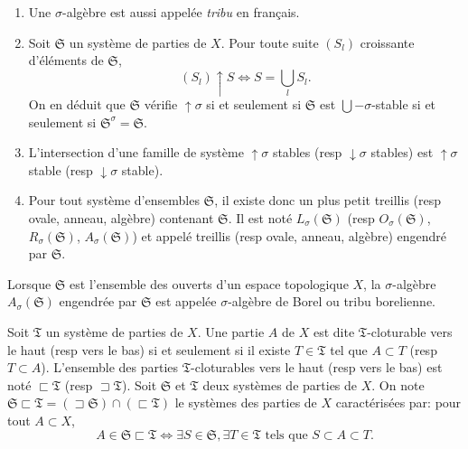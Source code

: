 \begin{rems}
\begin{enumerate}
 \item Une $\sigma$-algèbre est aussi appelée \emph{tribu} en français.
 \item Soit $\mathfrak{S}$ un système de parties de $X$. Pour toute suite $(S_l)$ croissante d'éléments de $\mathfrak{S}$,
   \begin{displaymath}
     (S_l)\uparrow S \Leftrightarrow  S = \bigcup_l S_l.
   \end{displaymath}
  On en déduit que $\mathfrak{S}$ vérifie $\uparrow \sigma$ si et seulement si $\mathfrak{S}$ est $\bigcup - \sigma$-stable si et seulement si $\mathfrak{S}^\sigma = \mathfrak{S}$.
 \item L'intersection d'une famille de système $\uparrow \sigma$ stables (resp $\downarrow \sigma$ stables) est $\uparrow \sigma$ stable (resp $\downarrow \sigma$ stable).
 \item Pour tout système d'ensembles $\mathfrak{S}$, il existe donc un plus petit treillis (resp ovale, anneau, algèbre) contenant $\mathfrak{S}$. Il est noté $L_\sigma(\mathfrak{S})$ (resp $O_\sigma(\mathfrak{S})$, $R_\sigma(\mathfrak{S})$, $A_\sigma(\mathfrak{S})$) et appelé treillis (resp ovale, anneau, algèbre) engendré par $\mathfrak{S}$.
\end{enumerate}
\end{rems}
\begin{exple}
Lorsque $\mathfrak{S}$ est l'ensemble des ouverts d'un espace topologique $X$, la $\sigma$-algèbre $A_\sigma(\mathfrak{S})$ engendrée par $\mathfrak{S}$ est appelée $\sigma$-algèbre de Borel ou tribu borelienne.
\end{exple}

\begin{defin}\label{Def:cloturable}  
 Soit $\mathfrak{T}$ un système de parties de $X$. Une partie $A$ de $X$ est dite $\mathfrak{T}$-cloturable vers le haut (resp vers le bas) si et seulement si il existe $T\in \mathfrak{T}$ tel que $A \subset T$ (resp $T \subset A$).\newline
 L'ensemble des parties $\mathfrak{T}$-cloturables vers le haut (resp vers le bas) est noté $\sqsubset \mathfrak{T}$ (resp $\sqsupset \mathfrak{T}$).\newline
 Soit $\mathfrak{S}$ et $\mathfrak{T}$ deux systèmes de parties de $X$. On note $\mathfrak{S} \sqsubset \mathfrak{T} = (\sqsupset \mathfrak{S}) \cap (\sqsubset \mathfrak{T})$ le systèmes des parties de $X$ caractérisées par: pour tout $A\subset X$,
 \begin{displaymath}
  A \in \mathfrak{S} \sqsubset \mathfrak{T} \Leftrightarrow
  \exists S \in \mathfrak{S}, \exists T \in \mathfrak{T} \text{ tels que } S \subset A \subset T.
 \end{displaymath}
\end{defin}

